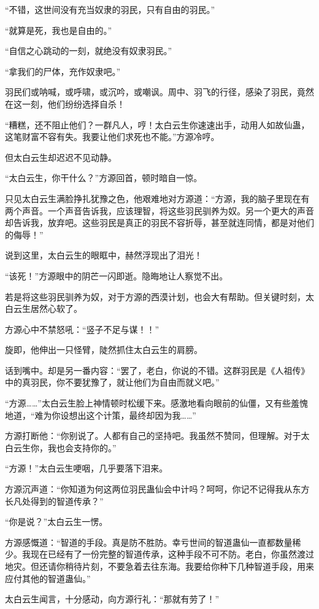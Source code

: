 \begin{this_body}
“不错，这世间没有充当奴隶的羽民，只有自由的羽民。”

“就算是死，我也是自由的。”

“自信之心跳动的一刻，就绝没有奴隶羽民。”

“拿我们的尸体，充作奴隶吧。”

羽民们或呐喊，或呼啸，或沉吟，或嘲讽。周中、羽飞的行径，感染了羽民，竟然在这一刻，他们纷纷选择自杀！

“糟糕，还不阻止他们？一群凡人，哼！太白云生你速速出手，动用人如故仙蛊，这笔财富不容有失。我要让他们求死也不能。”方源冷哼。

但太白云生却迟迟不见动静。

“太白云生，你干什么？”方源回首，顿时暗自一惊。

只见太白云生满脸挣扎犹豫之色，他艰难地对方源道：“方源，我的脑子里现在有两个声音。一个声音告诉我，应该理智，将这些羽民驯养为奴。另一个更大的声音却告诉我，放弃吧。这些羽民是真正的羽民不容折辱，甚至就连同情，都是对他们的侮辱！”

说到这里，太白云生的眼眶中，赫然浮现出了泪光！

“该死！”方源眼中的阴芒一闪即逝。隐晦地让人察觉不出。

若是将这些羽民驯养为奴，对于方源的西漠计划，也会大有帮助。但关键时刻，太白云生居然心软了。

方源心中不禁怒吼：“竖子不足与谋！！”

旋即，他伸出一只怪臂，陡然抓住太白云生的肩膀。

话到嘴中。却是另一番内容：“罢了，老白，你说的不错。这群羽民是《人祖传》中的真羽民，你不要犹豫了，就让他们为自由而就义吧。”

“方源……”太白云生脸上神情顿时松缓下来。感激地看向眼前的仙僵，又有些羞愧地道，“难为你设想出这个计策，最终却因为我……”

方源打断他：“你别说了。人都有自己的坚持吧。我虽然不赞同，但理解。对于太白云生你，我也会支持你的。”

“方源！”太白云生哽咽，几乎要落下泪来。

方源沉声道：“你知道为何这两位羽民蛊仙会中计吗？呵呵，你记不记得我从东方长凡处得到的智道传承？”

“你是说？”太白云生一愣。

方源感慨道：“智道的手段。真是防不胜防。幸亏世间的智道蛊仙一直都数量稀少。我现在已经有了一份完整的智道传承，这种手段不可不防。老白，你虽然渡过地灾。但还请你稍待片刻，不要急着去往东海。我要给你种下几种智道手段，用来应付其他的智道蛊仙。”

太白云生闻言，十分感动，向方源行礼：“那就有劳了！”


\end{this_body}
